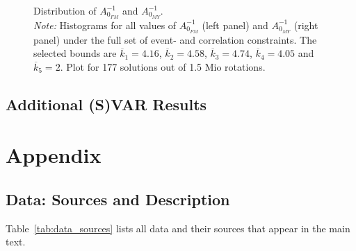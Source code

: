 \documentclass[a4paper,11pt,listof=nochaptergap,oneside,pointednumbers,bibtotoc,bigheadings,liststotoc,hidelinks]{scrbook}
\theoremstyle{mysatz}
\theoremstyle{mydefinition}
\theoremstyle{mytheorem}
\theoremstyle{mybemerkung}
\begin{document}
\begin{figure}[!h]
   \centering
   \setlength\fboxsep{0pt}
   \setlength\fboxrule{0pt}
      \caption[Distribution of $A_{0_{FM}}^{-1}$ and $A_{0_{MY}}^{-1}$.]{Distribution of $A_{0_{FM}}^{-1}$ and $A_{0_{MY}}^{-1}$.\\
      \textit{Note:} Histograms for all values of $A_{0_{FM}}^{-1}$ (left panel) and $A_{0_{MY}}^{-1}$ (right panel) under the full set of event- and correlation constraints. The selected bounds are $\overline{k}_1 = 4.16$, $\overline{k}_2 = 4.58$, $\overline{k}_3 = 4.74$, $\overline{k}_4 = 4.05$ and $\overline{k}_5 = 2$. Plot for 177 solutions out of 1.5 Mio rotations.}   \label{fig:distribution_impact_matrices_type3}
\end{figure}

\section{Additional (S)VAR Results}




\chapter{Appendix}
\label{DataAndCode}
\section{Data: Sources and Description}
\label{sec:dataAppendix}
Table~\ref{tab:data_sources} lists all data and their sources that appear in the main text.
\vspace*{350px}
\end{document}
